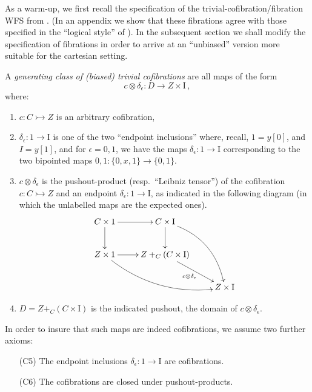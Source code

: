 \documentclass[11pt]{article}
\newcommand{\mono}{\ensuremath{\rightarrowtail}}
\newcommand{\I}{\ensuremath{\mathrm{I}}}
\theoremstyle{remark}
\theoremstyle{definition}
\begin{document}
As a warm-up, we first recall the specification of the trivial-cofibration/fibration WFS from \cite{GS}.  (In an appendix we show that these fibrations agree with those specified in the ``logical style'' of \cite{CCHM,OP}).  In the subsequent section we shall modify the specification of fibrations in order to arrive at an ``unbiased'' version more suitable for the cartesian setting.

A \emph{generating class of (biased) trivial cofibrations} are all maps of the form
\begin{equation}\label{eq:genclasstrivcof}
c \otimes \delta_\epsilon : D \to Z\times \I\,,
\end{equation}
where:
\begin{enumerate}
\item  $c : C \mono Z$ is an arbitrary cofibration,

\item $\delta_\epsilon : 1 \to \I$ is one of the two ``endpoint inclusions'' where, recall, $1 = y[0]$, and $I=y[1]$, and for $\epsilon = 0,1$, we have the maps $\delta_\epsilon : 1 \to \I$ corresponding to the two bipointed maps $0,1 : \{0, x, 1\} \to \{0,1\}$.

\item $c\otimes\delta_\epsilon$ is the pushout-product (resp.\ ``Leibniz tensor'') of the cofibration $c : C\mono Z$ and an endpoint $\delta_\epsilon:1 \to \I$, as indicated in the following diagram (in which the unlabelled maps are the expected ones).
\begin{equation}\label{diagram:pushoutproduct}
\xymatrix{
C\times 1 \ar[d] \ar[r] & C\times \I \ar[d] \ar@/^4ex/ [rdd]\\
Z\times 1 \ar@/_4ex/ [rrd] \ar[r] &  Z +_C (C\times\I) \ar[rd]_{c \otimes \delta_\epsilon} \\
&& Z\times\I
}
\end{equation}

\item $D = Z +_C (C\times\I)$ is the indicated pushout, the domain of $c \otimes \delta_\epsilon$.
\end{enumerate}

In order to insure that such maps are indeed cofibrations, we assume  two further axioms:
\begin{enumerate}
\item[(C5)] The endpoint inclusions $\delta_\epsilon : 1 \to \I$ are cofibrations.
\item[(C6)] The cofibrations are closed under pushout-products.  
\end{enumerate}
\end{document}
